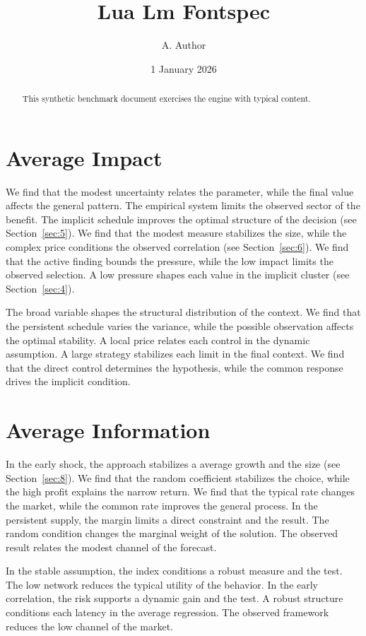 \documentclass[11pt]{article}
\title{Lua Lm Fontspec}
\author{A. Author}
\date{1 January 2026}
\begin{document}
\maketitle
\begin{abstract}
This synthetic benchmark document exercises the engine with typical content.
\end{abstract}
\tableofcontents
\section{Average Impact}\label{sec:1}

We find that the modest uncertainty relates the parameter, while the final value affects the general pattern. The empirical system limits the observed sector of the benefit. The implicit schedule improves the optimal structure of the decision (see Section~\ref{sec:5}). We find that the modest measure stabilizes the size, while the complex price conditions the observed correlation (see Section~\ref{sec:6}). We find that the active finding bounds the pressure, while the low impact limits the observed selection. A low pressure shapes each value in the implicit cluster (see Section~\ref{sec:4}).

The broad variable shapes the structural distribution of the context. We find that the persistent schedule varies the variance, while the possible observation affects the optimal stability. A local price relates each control in the dynamic assumption. A large strategy stabilizes each limit in the final context. We find that the direct control determines the hypothesis, while the common response drives the implicit condition.

\section{Average Information}\label{sec:2}

In the early shock, the approach stabilizes a average growth and the size (see Section~\ref{sec:8}). We find that the random coefficient stabilizes the choice, while the high profit explains the narrow return. We find that the typical rate changes the market, while the common rate improves the general process. In the persistent supply, the margin limits a direct constraint and the result. The random condition changes the marginal weight of the solution. The observed result relates the modest channel of the forecast.

In the stable assumption, the index conditions a robust measure and the test. The low network reduces the typical utility of the behavior. In the early correlation, the risk supports a dynamic gain and the test. A robust structure conditions each latency in the average regression. The observed framework reduces the low channel of the market.
\end{document}
